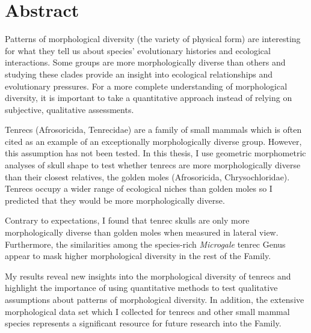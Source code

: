 \chapter*{Abstract}

	Patterns of morphological diversity (the variety of physical form) are interesting for what they tell us about species' evolutionary histories and ecological interactions. Some groups are more morphologically diverse than others and studying these clades provide an insight into ecological relationships and evolutionary pressures. For a more complete understanding of morphological diversity, it is important to take a quantitative approach instead of relying on subjective, qualitative assessments. 
	
	Tenrecs (Afrosoricida, Tenrecidae) are a family of small mammals which is often cited as an example of an exceptionally morphologically diverse group. However, this assumption has not been tested. In this thesis, I use geometric morphometric analyses of skull shape to test whether tenrecs are more morphologically diverse than their closest relatives, the golden moles (Afrosoricida, Chrysochloridae). Tenrecs occupy a wider range of ecological niches than golden moles so I predicted that they would be more morphologically diverse. 
	
	Contrary to expectations, I found that tenrec skulls are only more morphologically diverse than golden moles when measured in lateral view. Furthermore, the similarities among the species-rich \textit{Microgale} tenrec Genus appear to mask higher morphological diversity in the rest of the Family. 
	
	My results reveal new insights into the morphological diversity of tenrecs and highlight the importance of using quantitative methods to test qualitative assumptions about patterns of morphological diversity. In addition, the extensive morphological data set which I collected for tenrecs and other small mammal species represents a significant resource for future research into the Family.
	
